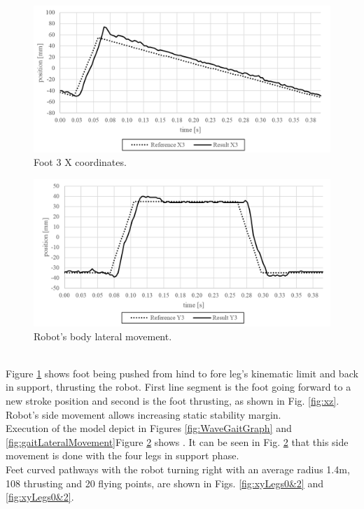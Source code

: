 \begin{figure}[htb!]
	\centering
	\includegraphics[width=1\linewidth]{./Figuras/x}
	\caption{Foot 3 X coordinates.}
	\label{fig:gaitFlightAndThrustPathway}
\end{figure}
\begin{figure}[htb!]
	\includegraphics[width=1\linewidth]{./Figuras/y}
	\caption{Robot's body lateral movement.} 
	\label{fig:y}
\end{figure}\\	
Figure \ref{fig:gaitFlightAndThrustPathway} shows foot being pushed from hind to fore leg's kinematic limit and back in support, thrusting the robot. First line segment is the foot going forward to a new stroke position and second is the foot thrusting, as shown in Fig. \ref{fig:xz}. Robot's side movement allows increasing static stability margin.\\ Execution of the model depict in Figures \ref{fig:WaveGaitGraph} and \ref{fig:gaitLateralMovement}Figure \ref{fig:y} shows . It can be seen in Fig. \ref{fig:y} that this side movement is done with the four legs in support phase.\\
Feet curved pathways with the robot turning right with an average radius 1.4m, 108 thrusting and 20 flying points, are shown in Figs. \ref{fig:xyLegs0&2} and \ref{fig:xyLegs0&2}.
